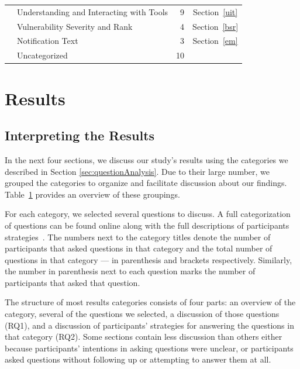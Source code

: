 \documentclass[10pt,journal,compsoc]{IEEEtran}
\begin{document}
\begin{table}
\begin{tabularx}{\textwidth}{|l|X|r|c|}
		
		
		& Understanding and Interacting with Tools						& 9     		& Section~\ref{uit}			\\
		
		& Vulnerability Severity and Rank								& 4     		& Section~\ref{bsr}		\\
		
		& Notification Text												& 3     		& Section~\ref{em}		\\
		
		\hline	
		& Uncategorized													& 10    		&			 \\
		\hline
	\end{tabularx}
	\label{table:categories}
\end{table}



\section{Results}
\label{sec:results}
\subsection{Interpreting the Results}

In the next four sections, we discuss our study's results using the categories we described in Section \ref{sec:questionAnalysis}.
Due to their large number, we grouped the categories to organize and facilitate discussion about our findings. 
Table~\ref{table:categories} provides an overview of these groupings.

For each category, we selected several questions to discuss. A full categorization of questions can be found online along with the full descriptions of participants strategies~\cite{ExperimentalMaterials}.
The numbers next to the category titles denote the number of participants that asked questions in that category and the total number of questions in that category --- in parenthesis and brackets respectively. Similarly, the number in parenthesis next to each question marks the number of participants that asked that question.

The structure of most results categories consists of four parts: an overview of the category, several of the questions we selected, a discussion of those questions (RQ1), and a discussion of participants' strategies for answering the questions in that category (RQ2).
Some sections contain less discussion than others either because participants' intentions in asking questions were unclear, or participants asked questions without following up or attempting to answer them at all. 
\end{document}
